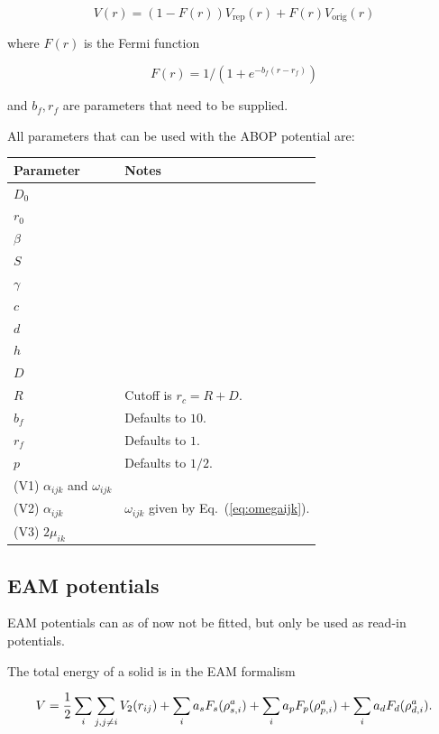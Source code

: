 \documentclass[a4paper,12pt,pdftex,onecolumn]{article}
\begin{document}
\begin{equation}
V(r) = (1-F(r)) V_{\mathrm{rep}}(r) + F(r) V_{\mathrm{orig}}(r)
\end{equation}

where $F(r)$ is the Fermi function

\begin{equation}
F(r) = 1/(1 + e^{-b_f(r-r_f)})
\end{equation}

and $b_f, r_f$ are parameters that need to be supplied.

All parameters that can be used with the ABOP potential are:

\begin{center}
\begin{tabular}{|l|l|}
\hline
\hline
Parameter & Notes \\
\hline
\hline
$D_0$ & \\
$r_0$ & \\
$\beta$ & \\
$S$ & \\
$\gamma$ & \\
$c$ & \\
$d$ & \\
$h$ & \\
$D$ & \\
$R$ & Cutoff is $r_c = R + D$. \\
$b_f$ & Defaults to $10$. \\
$r_f$ & Defaults to $1$. \\
$p$ & Defaults to $1/2$. \\
\hline
(V1) $\alpha_{ijk}$ and $\omega_{ijk}$ & \\
(V2) $\alpha_{ijk}$ & $\omega_{ijk}$ given by Eq.~(\ref{eq:omegaijk}).\\
(V3) $2\mu_{ik}$ & \\
\hline
\hline
\end{tabular}
\end{center}





\subsection{EAM potentials}

EAM potentials can as of now not be fitted, but only be used
as read-in potentials.

The total energy of a solid is in the EAM formalism

\begin{equation}
V = {1 \over 2} \sum_i \sum_{j, j \neq i} V_2(r_{ij})
+ \sum_i a_s F_s(\rho^a_{s,i})
+ \sum_i a_p F_p(\rho^a_{p,i})
+ \sum_i a_d F_d(\rho^a_{d,i}).
\end{equation}
\end{document}
